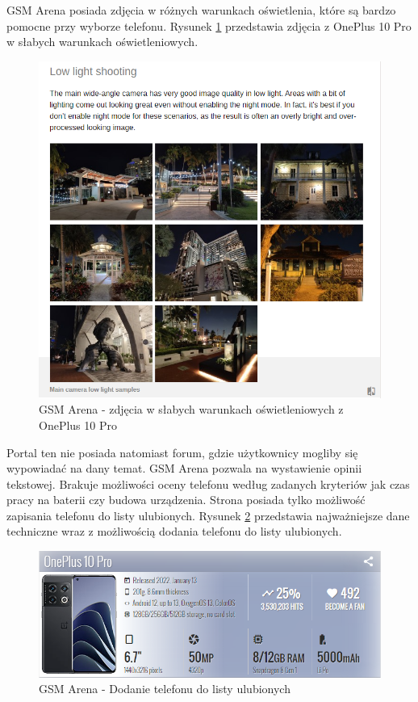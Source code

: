 GSM Arena posiada zdjęcia w różnych warunkach oświetlenia, które są bardzo pomocne przy wyborze telefonu. Rysunek \ref*{GSM_Arena_3} przedstawia zdjęcia z OnePlus 10 Pro w słabych warunkach oświetleniowych.
\begin{figure}[H]
    \centering
    \includegraphics[scale=0.7]{img/GSM Arena/GSMArena_picture_sample_lowlight.png}
    \caption{GSM Arena - zdjęcia w słabych warunkach oświetleniowych z OnePlus 10 Pro}
    \label{GSM_Arena_3}
\end{figure}
Portal ten nie posiada natomiast forum, gdzie użytkownicy mogliby się wypowiadać na dany temat. GSM Arena pozwala na wystawienie opinii tekstowej. Brakuje możliwości oceny telefonu według zadanych kryteriów jak czas pracy na baterii czy budowa urządzenia. Strona posiada tylko możliwość zapisania telefonu do listy ulubionych. Rysunek \ref*{GSM_Arena_4} przedstawia najważniejsze dane techniczne wraz z możliwością dodania telefonu do listy ulubionych.

\begin{figure}[H]
    \centering
    \includegraphics[scale=0.7]{img/GSM Arena/GSMArena_become_a_fan.png}
    \caption{GSM Arena - Dodanie telefonu do listy ulubionych}
    \label{GSM_Arena_4}
\end{figure}

